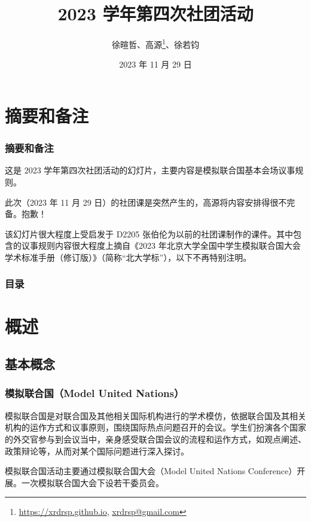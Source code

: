 \documentclass{beamer}
\title{2023 学年第四次社团活动}
\author{徐暄哲、高源\thanks{\href{https://xrdrsp.github.io}{https://xrdrsp.github.io}, \href{mailto:xrdrsp@gmail.com}{xrdrsp@gmail.com}}、徐若钧}
\institute{宁波效实中学（东部校区）模拟联合国社团}
\date{2023 年 11 月 29 日}
\begin{document}
\maketitle

\section{摘要和备注}

\begin{frame}
    \frametitle{摘要和备注}

    这是 2023 学年第四次社团活动的幻灯片，主要内容是模拟联合国基本会场议事规则。

    此次（2023 年 11 月 29 日）的社团课是突然产生的，高源将内容安排得很不完备。抱歉！

    该幻灯片很大程度上受启发于 D2205 张伯伦为以前的社团课制作的课件。其中包含的议事规则内容很大程度上摘自《2023 年北京大学全国中学生模拟联合国大会学术标准手册（修订版）》（简称“北大学标”），以下不再特别注明。
\end{frame}

\begin{frame}
\frametitle{目录}
\begin{multicols}{2}
\tableofcontents
\end{multicols}
\end{frame}

\section{概述}

\subsection{基本概念}

\begin{frame}

\frametitle{模拟联合国（Model United Nations）}

模拟联合国是对联合国及其他相关国际机构进行的学术模仿，依据联合国及其相关机构的运作方式和议事原则，围绕国际热点问题召开的会议。学生们扮演各个国家的外交官参与到会议当中，亲身感受联合国会议的流程和运作方式，如观点阐述、政策辩论等，从而对某个国际问题进行深入探讨。


模拟联合国活动主要通过模拟联合国大会（Model United Nations Conference）开展。一次模拟联合国大会下设若干委员会。


\end{frame}
\end{document}
